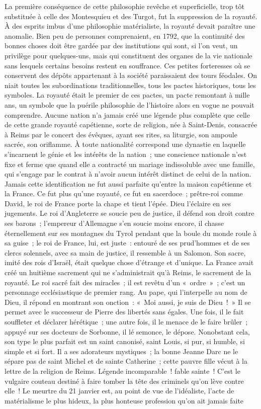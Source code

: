 \documentclass[french,twoside]{book} %
\begin{document}
La première conséquence de cette philosophie revêche et superficielle, trop tôt substituée à celle des Montesquieu et des Turgot, fut la suppression de la royauté. À des esprits imbus d’une philosophie matérialiste, la royauté devait paraître une anomalie. Bien peu de personnes comprenaient, en 1792, que la continuité des bonnes choses doit être gardée par des institutions qui sont, si l’on veut, un privilège pour quelques-uns, mais qui constituent des organes de la vie nationale sans lesquels certains besoins restent en souffrance. Ces petites forteresses où se conservent des dépôts appartenant à la société paraissaient des tours féodales. On niait toutes les subordinations traditionnelles, tous les pactes historiques, tous les symboles. La royauté était le premier de ces pactes, un pacte remontant à mille ans, un symbole que la puérile philosophie de l’histoire alors en vogue ne pouvait comprendre. Aucune nation n’a jamais créé une légende plus complète que celle de cette grande royauté capétienne, sorte de religion, née à Saint-Denis, consacrée à Reims par le concert des évêques, ayant ses rites, sa liturgie, son ampoule sacrée, son oriflamme. À toute nationalité correspond une dynastie en laquelle s’incarnent le génie et les intérêts de la nation ; une conscience nationale n’est fixe et ferme que quand elle a contracté un mariage indissoluble avec une famille, qui s’engage par le contrat à n’avoir aucun intérêt distinct de celui de la nation. Jamais cette identification ne fut aussi parfaite qu’entre la maison capétienne et la France. Ce fut plus qu’une royauté, ce fut en sacerdoce ; prêtre-roi comme David, le roi de France porte la chape et tient l’épée. Dieu l’éclaire en ses jugements. Le roi d’Angleterre se soucie peu de justice, il défend son droit contre ses barons ; l’empereur d’Allemagne s’en soucie moins encore, il chasse éternellement sur ses montagnes du Tyrol pendant que la boule du monde roule à sa guise ; le roi de France, lui, est juste : entouré de ses prud’hommes et de ses clercs solennels, avec sa main de justice, il ressemble à un Salomon. Son sacre, imité des rois d’Israël, était quelque chose d’étrange et d’unique. La France avait créé un huitième sacrement qui ne s’administrait qu’à Reims, le sacrement de la royauté. Le roi sacré fait des miracles ; il est revêtu d’un « ordre » ; c’est un personnage ecclésiastique de premier rang. Au pape, qui l’interpelle au nom de Dieu, il répond en montrant son onction : « Moi aussi, je suis de Dieu ! » Il se permet avec le successeur de Pierre des libertés sans égales. Une fois, il le fait souffleter et déclarer hérétique ; une autre fois, il le menace de le faire brûler ; appuyé sur ses docteurs de Sorbonne, il lé semonce, le dépose. Nonobstant cela, son type le plus parfait est un saint canonisé, saint Louis, si pur, si humble, si simple et si fort. Il a ses adorateurs mystiques ; la bonne Jeanne Darc ne le sépare pas de saint Michel et de sainte Catherine ; cette pauvre fille vécut à la lettre de la religion de Reims. Légende incomparable ! fable sainte ! C’est le vulgaire couteau destiné à faire tomber la tête des criminels qu’on lève contre elle ! Le meurtre du 21 janvier est, au point de vue de l’idéaliste, l’acte de matérialisme le plus hideux, la plus honteuse profession qu’on ait jamais faite 
\end{document}
